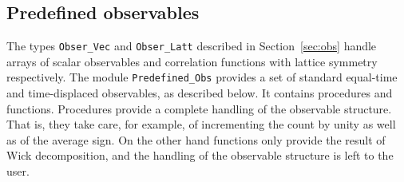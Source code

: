 %
\subsection{Predefined observables} \label{sec:predefined_observales}

The types \texttt{Obser\_Vec} and \texttt{Obser\_Latt} described in Section~\ref{sec:obs} handle arrays of scalar observables and correlation functions with lattice symmetry respectively.
The module \texttt{Predefined\_Obs} provides a set of standard equal-time and time-displaced observables, as described below.  
It contains procedures and functions.   Procedures  provide a complete handling of the observable structure. That is, they take care,  for example, of incrementing the count by unity  as well as of the average sign. On the other hand functions only provide the result of Wick decomposition, and the handling of the observable structure is left to the user. 

